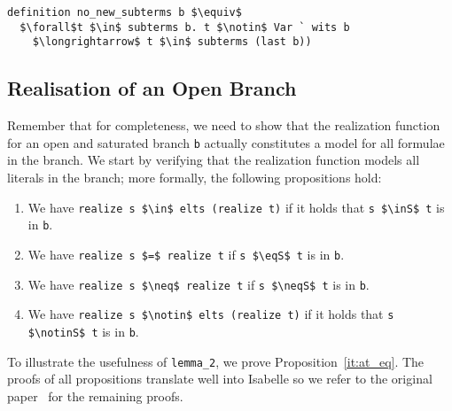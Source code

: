 \documentclass[sigplan,10pt,anonymous,review]{acmart}
\newcommand{\inS}{\in_\text{s}}
\newcommand{\notinS}{\notin_\text{s}}
\newcommand{\eqS}{=_\text{s}}
\newcommand{\neqS}{\neq_\text{s}}
\begin{document}
\begin{lstlisting}
definition no_new_subterms b $\equiv$
  $\forall$t $\in$ subterms b. t $\notin$ Var ` wits b
    $\longrightarrow$ t $\in$ subterms (last b))
\end{lstlisting}

\subsection{Realisation of an Open Branch\label{sec:real}}
Remember that for completeness, we need to show that the realization function for an open and saturated branch \lstinline!b! actually constitutes a model for all formulae in the branch.
We start by verifying that the realization function models all literals in the branch; more formally, the following propositions hold: 
\begin{enumerate}[label=(\roman*)]
  \item\label{it:at_mem} We have \lstinline!realize s $\in$ elts (realize t)! if it holds that \lstinline!s $\inS$ t! is in \lstinline!b!. 
  \item\label{it:at_eq} We have \lstinline!realize s $=$ realize t! if \lstinline!s $\eqS$ t! is in \lstinline!b!.
  \item\label{it:af_eq} We have \lstinline!realize s $\neq$ realize t! if \lstinline!s $\neqS$ t! is in \lstinline!b!.
  \item\label{it:af_mem} We have \lstinline!realize s $\notin$ elts (realize t)! if it holds that \lstinline!s $\notinS$ t! is in \lstinline!b!. 
\end{enumerate}
To illustrate the usefulness of \lstinline!lemma_2!, we prove Proposition~\ref{it:at_eq}.
The proofs of all propositions translate well into Isabelle so we refer to the original paper~\cite{new_fast_tableau} for the remaining proofs. 
\end{document}
